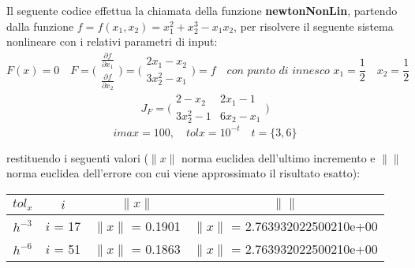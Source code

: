 Il seguente codice effettua la chiamata della funzione \textbf{newtonNonLin}, partendo dalla funzione $f = f(x_1,x_2)=x_1^2+x_2^3-x_1x_2$, per risolvere il seguente sistema nonlineare con i relativi parametri di input:
	\[
	F(x)=0 \quad
	F=\Bigg(\begin{matrix}
		\frac{\partial f}{\partial x_1} \\
		\frac{\partial f}{\partial x_2} 
	\end{matrix}\Bigg) = 
	\Bigg(\begin{matrix}
		2x_1-x_2 \\
		3x_2^2-x_1
	\end{matrix}\Bigg)=f \quad
	\textit{con punto di innesco } x_1=\frac{1}{2} \quad x_2=\frac{1}{2}
	\]
	\[
	J_F=\Bigg(\begin{matrix}
		2-x_2 & 2x_1-1 \\
		3x_2^2-1 & 6x_2-x_1 
	\end{matrix}\Bigg)
	\]
	\[
	imax=100, \quad 
	tolx=10^{-t} \quad t=\{3,6\}
	\]

restituendo i seguenti valori ($\|x\|$ norma euclidea dell'ultimo incremento e $\|\|$ norma euclidea dell'errore con cui viene approssimato il risultato esatto):
\begin{center}
	\begin{tabular}{|c|c|c|c|}
		\hline
			$tol_x$ & $i$ & $\|x\|$ & $\|\|$ \\
		\hline
    		$h^{-3}$ & $i$ = 17 & $\|x\|$ = 0.1901 & $\|x\|$ = 2.763932022500210e+00\\
    		$h^{-6}$ & $i$ = 51 & $\|x\|$ = 0.1863 & $\|x\|$ = 2.763932022500210e+00\\
		\hline
	\end{tabular}
\end{center}